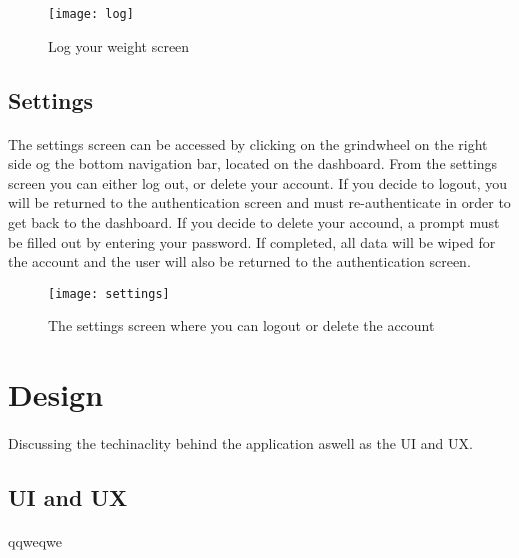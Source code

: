 \documentclass{article}
\begin{document}
    \hfill \break
    \hfill \break
            
    \begin{figure}[h!]
        \texttt{[image: log]}
        \centering
        \caption{Log your weight screen}
    \end{figure}
    \newpage

\subsection{Settings}
\paragraph{}
    The settings screen can be accessed by clicking on the grindwheel on the right side og the bottom navigation bar, located on the dashboard.
    From the settings screen you can either log out, or delete your account. If you decide to logout, you will be returned to the authentication screen
    and must re-authenticate in order to get back to the dashboard. If you decide to delete your accound, a prompt must be filled out by entering your password.
    If completed, all data will be wiped for the account and the user will also be returned to the authentication screen.
  
    \hfill \break
    \hfill \break
                
    \begin{figure}[h!]
        \texttt{[image: settings]}
        \centering
        \caption{The settings screen where you can logout or delete the account}
    \end{figure}

\newpage

\section{Design}
\paragraph{}
    Discussing the techinaclity behind the application aswell as the UI and UX.

    \hfill \break
    \hfill \break

\subsection{UI and UX}
\paragraph{}
    qqweqwe
\end{document}
